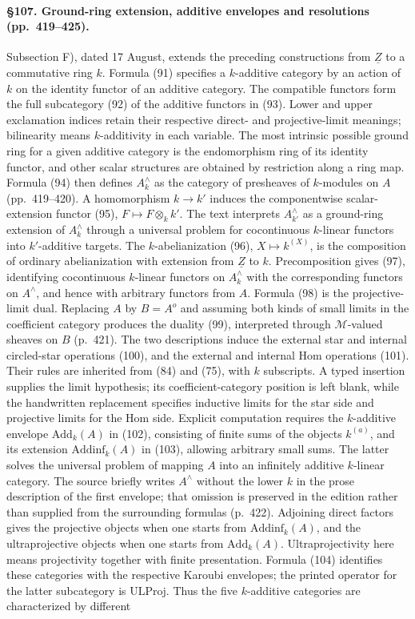 \paragraph{\S107. Ground-ring extension, additive envelopes and resolutions (pp.\ 419--425).}
Subsection F), dated 17 August, extends the preceding constructions from $\underline Z$ to a commutative ring $k$. Formula (91) specifies a $k$-additive category by an action of $k$ on the identity functor of an additive category. The compatible functors form the full subcategory (92) of the additive functors in (93). Lower and upper exclamation indices retain their respective direct- and projective-limit meanings; bilinearity means $k$-additivity in each variable. The most intrinsic possible ground ring for a given additive category is the endomorphism ring of its identity functor, and other scalar structures are obtained by restriction along a ring map. Formula (94) then defines $A^\wedge_k$ as the category of presheaves of $k$-modules on $A$ (pp.\ 419--420). A homomorphism $k\to k'$ induces the componentwise scalar-extension functor (95), $F\mapsto F\otimes_k k'$. The text interprets $A^\wedge_{k'}$ as a ground-ring extension of $A^\wedge_k$ through a universal problem for cocontinuous $k$-linear functors into $k'$-additive targets. The $k$-abelianization (96), $X\mapsto k^{(X)}$, is the composition of ordinary abelianization with extension from $\underline Z$ to $k$. Precomposition gives (97), identifying cocontinuous $k$-linear functors on $A^\wedge_k$ with the corresponding functors on $A^\wedge$, and hence with arbitrary functors from $A$. Formula (98) is the projective-limit dual. Replacing $A$ by $B=A^o$ and assuming both kinds of small limits in the coefficient category produces the duality (99), interpreted through $\mathcal M$-valued sheaves on $B$ (p.\ 421). The two descriptions induce the external star and internal circled-star operations (100), and the external and internal Hom operations (101). Their rules are inherited from (84) and (75), with $k$ subscripts. A typed insertion supplies the limit hypothesis; its coefficient-category position is left blank, while the handwritten replacement specifies inductive limits for the star side and projective limits for the Hom side. Explicit computation requires the $k$-additive envelope $\mathrm{Add}_k(A)$ in (102), consisting of finite sums of the objects $k^{(a)}$, and its extension $\mathrm{Addinf}_k(A)$ in (103), allowing arbitrary small sums. The latter solves the universal problem of mapping $A$ into an infinitely additive $k$-linear category. The source briefly writes $A^\wedge$ without the lower $k$ in the prose description of the first envelope; that omission is preserved in the edition rather than supplied from the surrounding formulas (p.\ 422). Adjoining direct factors gives the projective objects when one starts from $\mathrm{Addinf}_k(A)$, and the ultraprojective objects when one starts from $\mathrm{Add}_k(A)$. Ultraprojectivity here means projectivity together with finite presentation. Formula (104) identifies these categories with the respective Karoubi envelopes; the printed operator for the latter subcategory is $\mathrm{ULProj}$. Thus the five $k$-additive categories are characterized by different 